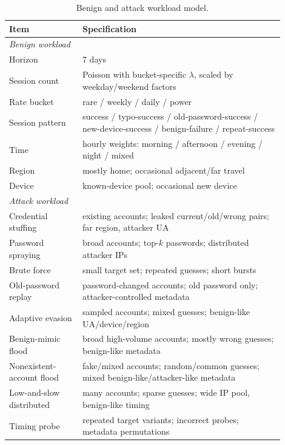 \begin{table}[t]
\centering
\scriptsize
\setlength{\tabcolsep}{3pt}
\caption{Benign and attack workload model.}
\label{tab:workload-model}
\begin{tabular}{p{0.24\linewidth} p{0.66\linewidth}}
\toprule
\textbf{Item} & \textbf{Specification} \\
\midrule
\multicolumn{2}{l}{\textit{Benign workload}} \\
Horizon & 7 days \\
Session count & Poisson with bucket-specific \(\lambda\), scaled by weekday/weekend factors \\
Rate bucket & rare / weekly / daily / power \\
Session pattern & success / typo-success / old-password-success / new-device-success / benign-failure / repeat-success \\
Time & hourly weights: morning / afternoon / evening / night / mixed \\
Region & mostly home; occasional adjacent/far travel \\
Device & known-device pool; occasional new device \\
\midrule
\multicolumn{2}{l}{\textit{Attack workload}} \\
Credential stuffing & existing accounts; leaked current/old/wrong pairs; far region, attacker UA \\
Password spraying & broad accounts; top-\(k\) passwords; distributed attacker IPs \\
Brute force & small target set; repeated guesses; short bursts \\
Old-password replay & password-changed accounts; old password only; attacker-controlled metadata \\
Adaptive evasion & sampled accounts; mixed guesses; benign-like UA/device/region \\
Benign-mimic flood & broad high-volume accounts; mostly wrong guesses; benign-like metadata \\
Nonexistent-account flood & fake/mixed accounts; random/common guesses; mixed benign-like/attacker-like metadata \\
Low-and-slow distributed & many accounts; sparse guesses; wide IP pool, benign-like timing \\
Timing probe & repeated target variants; incorrect probes; metadata permutations \\
\bottomrule
\end{tabular}
\end{table}

